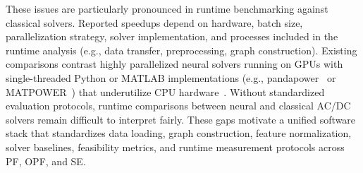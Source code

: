 These issues are particularly pronounced in runtime benchmarking against classical solvers. Reported speedups depend on hardware, batch size, parallelization strategy, solver implementation, and processes included in the runtime analysis (e.g., data transfer, preprocessing, graph construction). Existing comparisons contrast highly parallelized neural solvers running on GPUs with single-threaded Python or MATLAB implementations (e.g., pandapower~\cite{pandapower} or MATPOWER~\cite{matpower}) that underutilize CPU hardware~\cite{piloto2024, NEURIPS2025_d000ef56, arowolo2025}. Without standardized evaluation protocols, runtime comparisons between neural and classical AC/DC solvers remain difficult to interpret fairly. These gaps motivate a unified software stack that standardizes data loading, graph construction, feature normalization, solver baselines, feasibility metrics, and runtime measurement protocols across PF, OPF, and SE.\\

